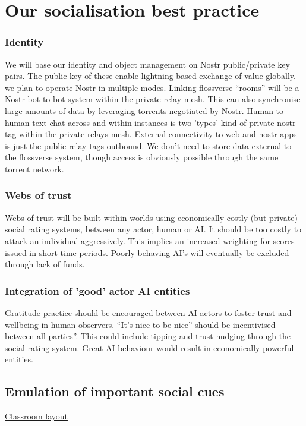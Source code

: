 \section{Our socialisation best practice}
\subsubsection{Identity}
We will base our identity and object management on Nostr public/private key pairs. The public key of these enable lightning based exchange of value globally. %
we plan to operate Nostr in multiple modes. Linking flossverse ``rooms'' will be a Nostr bot to bot system within the private relay mesh. This can also synchronise large amounts of data by leveraging torrents \href{https://iris.to/#/settings}{negotiated by Nostr}. Human to human text chat across and within instances is two 'types' kind of private nostr tag within the private relays mesh. External connectivity to web and nostr apps is just the public relay tags outbound. We don't need to store data external to the flossverse system, though access is obviously possible through the same torrent network.
\subsubsection{Webs of trust}
Webs of trust will be built within worlds using economically costly (but private) social rating systems, between any actor, human or AI. It should be too costly to attack an individual aggressively. This implies an increased weighting for scores issued in short time periods. Poorly behaving AI's will eventually be excluded through lack of funds.
\subsubsection{Integration of 'good' actor AI entities}
Gratitude practice should be encouraged between AI actors to foster trust and wellbeing in human observers. ``It's nice to be nice'' should be incentivised between all parties''. This could include tipping and trust nudging through the social rating system. Great AI behaviour would result in economically powerful entities.
\subsection{Emulation of important social cues}
\href{https://www.cleverclassroomsdesign.co.uk/general-5}{Classroom layout}
